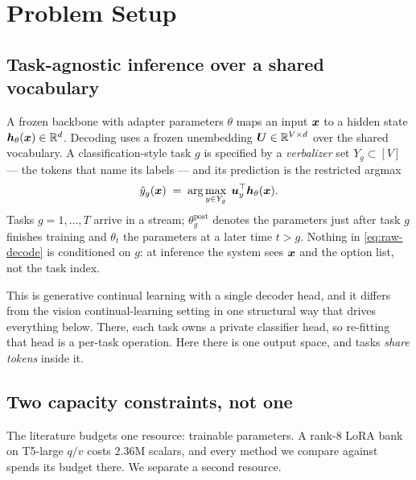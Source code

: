 \section{Problem Setup}
\label{sec:setup}

\subsection{Task-agnostic inference over a shared vocabulary}

A frozen backbone with adapter parameters $\theta$ maps an input $\bm{x}$ to a
hidden state $\bm{h}_\theta(\bm{x})\in\mathbb{R}^d$. Decoding uses a frozen unembedding
$\bm{U}\in\mathbb{R}^{V\times d}$ over the shared vocabulary. A classification-style task
$g$ is specified by a \emph{verbalizer} set $Y_g\subset[V]$ --- the tokens that
name its labels --- and its prediction is the restricted argmax
\begin{equation}
  \hat y_g(\bm{x})\;=\;\arg\max_{y\in Y_g}\; \bm{u}_y^\top \bm{h}_\theta(\bm{x}).
  \label{eq:raw-decode}
\end{equation}
Tasks $g=1,\dots,T$ arrive in a stream; $\theta_g^{\mathrm{post}}$ denotes the
parameters just after task $g$ finishes training and $\theta_t$ the parameters at
a later time $t>g$. Nothing in \eqref{eq:raw-decode} is conditioned on $g$: at
inference the system sees $\bm{x}$ and the option list, not the task index.

This is generative continual learning with a single decoder head, and it differs
from the vision continual-learning setting in one structural way that drives
everything below. There, each task owns a private classifier head, so re-fitting
that head is a per-task operation. Here there is one output space, and tasks
\emph{share tokens} inside it.

\subsection{Two capacity constraints, not one}

The literature budgets one resource: trainable parameters. A rank-$8$ LoRA bank
on T5-large $q/v$ costs $2.36$M scalars, and every method we compare against
spends its budget there. We separate a second resource.

